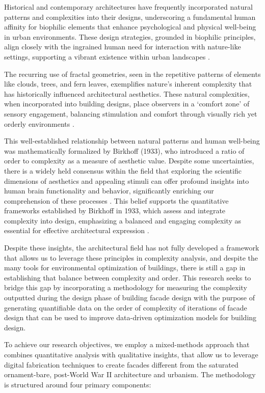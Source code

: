 Historical and contemporary architectures have frequently incorporated natural patterns and complexities into their designs, underscoring a fundamental human affinity for biophilic elements that enhance psychological and physical well-being in urban environments.
These design strategies, grounded in biophilic principles, align closely with the ingrained human need for interaction with nature-like settings, supporting a vibrant existence within urban landscapes \cite{Browning2014}.

The recurring use of fractal geometries, seen in the repetitive patterns of elements like clouds, trees, and fern leaves, exemplifies nature's inherent complexity that has historically influenced architectural aesthetics.
These natural complexities, when incorporated into building designs, place observers in a `comfort zone' of sensory engagement, balancing stimulation and comfort through visually rich yet orderly environments \cite{Browning2014}.

This well-established relationship between natural patterns and human well-being was mathematically formalized by Birkhoff (1933), who introduced a ratio of order to complexity as a measure of aesthetic value\cite{Birkhoff1933}.
Despite some uncertainties, there is a widely held consensus within the field that exploring the scientific dimensions of aesthetics and appealing stimuli can offer profound insights into human brain functionality and behavior, significantly enriching our comprehension of these processes \cite{Redies2015}.
This belief supports the quantitative frameworks established by Birkhoff in 1933, which assess and integrate complexity into design, emphasizing a balanced and engaging complexity as essential for effective architectural expression \cite{Birkhoff1933}.

Despite these insights, the architectural field has not fully developed a framework that allows us to leverage these principles in complexity analysis, and despite the many tools for environmental optimization of buildings, there is still a gap in establishing that balance between complexity and order.
This research seeks to bridge this gap by incorporating a methodology for measuring the complexity outputted during the design phase of building facade design with the purpose of generating quantifiable data on the order of complexity of iterations of facade design that can be used to improve data-driven optimization models for building design.

To achieve our research objectives, we employ a mixed-methods approach that combines quantitative analysis with qualitative insights, that allow us to leverage digital fabrication techniques to create facades different from the saturated ornament-bare, post-World War II architecture and urbanism.
The methodology is structured around four primary components:

